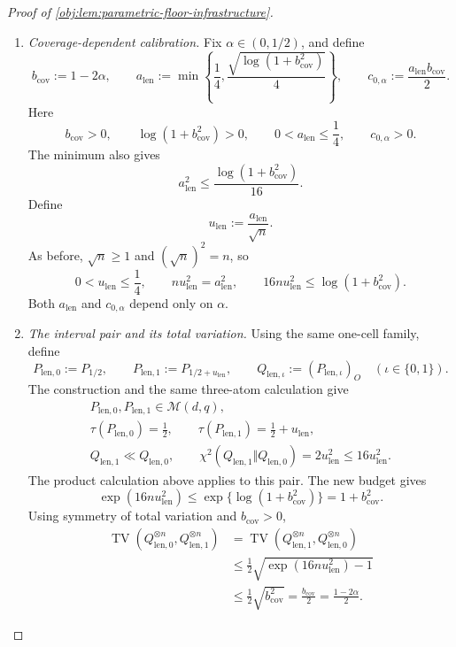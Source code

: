 \documentclass[11pt]{article}
\begin{document}
\begin{proof}[Proof of \cref{obj:lem:parametric-floor-infrastructure}]
\begin{enumerate}
\item \emph{Coverage-dependent calibration.}
Fix \(\alpha\in(0,1/2)\), and define
\[
b_{\mathrm{cov}}:=1-2\alpha,
\qquad
a_{\mathrm{len}}
:=
\min\left\{
\frac14,\frac{\sqrt{\log(1+b_{\mathrm{cov}}^2)}}4
\right\},
\qquad
c_{0,\alpha}:=\frac{a_{\mathrm{len}}b_{\mathrm{cov}}}{2}.
\]
Here
\[
b_{\mathrm{cov}}>0,
\qquad
\log(1+b_{\mathrm{cov}}^2)>0,
\qquad
0<a_{\mathrm{len}}\le\frac14,
\qquad
c_{0,\alpha}>0.
\]
The minimum also gives
\[
a_{\mathrm{len}}^2
\le\frac{\log(1+b_{\mathrm{cov}}^2)}{16}.
\]
Define
\[
u_{\mathrm{len}}:=\frac{a_{\mathrm{len}}}{\sqrt n}.
\]
As before, \(\sqrt n\ge1\) and \((\sqrt n)^2=n\), so
\[
0<u_{\mathrm{len}}\le\frac14,
\qquad
n u_{\mathrm{len}}^2=a_{\mathrm{len}}^2,
\qquad
16n u_{\mathrm{len}}^2\le\log(1+b_{\mathrm{cov}}^2).
\]
Both \(a_{\mathrm{len}}\) and \(c_{0,\alpha}\) depend only on \(\alpha\).

\item \emph{The interval pair and its total variation.}
Using the same one-cell family, define
\[
P_{\mathrm{len},0}:=P_{1/2},
\qquad
P_{\mathrm{len},1}:=P_{1/2+u_{\mathrm{len}}},
\qquad
Q_{\mathrm{len},\iota}:=(P_{\mathrm{len},\iota})_O
\quad(\iota\in\{0,1\}).
\]
The construction and the same three-atom calculation give
\[
\begin{gathered}
P_{\mathrm{len},0},P_{\mathrm{len},1}\in\mathcal M(d,q),\\
\tau(P_{\mathrm{len},0})=\frac12,
\qquad
\tau(P_{\mathrm{len},1})=\frac12+u_{\mathrm{len}},\\
Q_{\mathrm{len},1}\ll Q_{\mathrm{len},0},
\qquad
\chi^2(Q_{\mathrm{len},1}\Vert Q_{\mathrm{len},0})
=2u_{\mathrm{len}}^2\le16u_{\mathrm{len}}^2.
\end{gathered}
\]
The product calculation above applies to this pair. The new budget gives
\[
\exp(16n u_{\mathrm{len}}^2)
\le
\exp\{\log(1+b_{\mathrm{cov}}^2)\}
=
1+b_{\mathrm{cov}}^2.
\]
Using symmetry of total variation and \(b_{\mathrm{cov}}>0\),
\[
\begin{aligned}
\operatorname{TV}
 (Q_{\mathrm{len},0}^{\otimes n},Q_{\mathrm{len},1}^{\otimes n})
&=
\operatorname{TV}
 (Q_{\mathrm{len},1}^{\otimes n},Q_{\mathrm{len},0}^{\otimes n})\\
&\le\frac12\sqrt{\exp(16n u_{\mathrm{len}}^2)-1}\\
&\le\frac12\sqrt{b_{\mathrm{cov}}^2}
=\frac{b_{\mathrm{cov}}}{2}
=\frac{1-2\alpha}{2}.
\end{aligned}
\]


\end{enumerate}
\end{proof}
\end{document}
